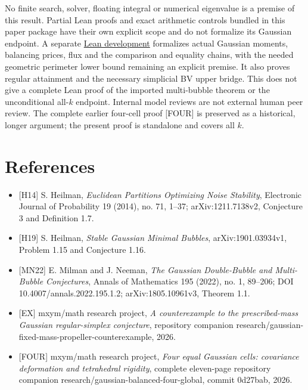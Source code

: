 \documentclass[
  11pt,
]{article}
\providecommand{\tightlist}{%
  \setlength{\itemsep}{0pt}\setlength{\parskip}{0pt}}
\begin{document}
No finite search, solver, floating integral or numerical eigenvalue is a
premise of this result. Partial Lean proofs and exact arithmetic
controls bundled in this paper package have their own explicit scope and
do not formalize its Gaussian endpoint. A separate
\href{https://github.com/mxym/math/pull/3}{Lean development} formalizes
actual Gaussian moments, balancing prices, flux and the comparison and
equality chains, with the needed geometric perimeter lower bound
remaining an explicit premise. It also proves regular attainment and the
necessary simplicial BV upper bridge. This does not give a complete Lean
proof of the imported multi-bubble theorem or the unconditional
all-\(k\) endpoint. Internal model reviews are not external human peer
review. The complete earlier four-cell proof {[}FOUR{]} is preserved as
a historical, longer argument; the present proof is standalone and
covers all \(k\).

\section{References}\label{references}

\begin{itemize}
\tightlist
\item
  {[}H14{]} S. Heilman, \emph{Euclidean Partitions Optimizing Noise
  Stability}, Electronic Journal of Probability 19 (2014), no. 71,
  1--37; arXiv:1211.7138v2, Conjecture 3 and Definition 1.7.
\item
  {[}H19{]} S. Heilman, \emph{Stable Gaussian Minimal Bubbles},
  arXiv:1901.03934v1, Problem 1.15 and Conjecture 1.16.
\item
  {[}MN22{]} E. Milman and J. Neeman, \emph{The Gaussian Double-Bubble
  and Multi-Bubble Conjectures}, Annals of Mathematics 195 (2022), no.
  1, 89--206; DOI 10.4007/annals.2022.195.1.2; arXiv:1805.10961v3,
  Theorem 1.1.
\item
  {[}EX{]} mxym/math research project, \emph{A counterexample to the
  prescribed-mass Gaussian regular-simplex conjecture}, repository
  companion research/gaussian-fixed-mass-propeller-counterexample, 2026.
\item
  {[}FOUR{]} mxym/math research project, \emph{Four equal Gaussian
  cells: covariance deformation and tetrahedral rigidity}, complete
  eleven-page repository companion
  research/gaussian-balanced-four-global, commit 0d27bab, 2026.
\end{itemize}
\end{document}
